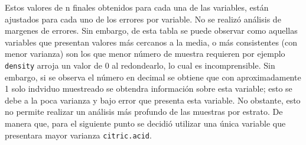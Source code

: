 \documentclass[
]{article}
\begin{document}
Estos valores de n finales obtenidos para cada una de las variables,
están ajustados para cada uno de los errores por variable. No se realizó
análisis de margenes de errores. Sin embargo, de esta tabla se puede
observar como aquellas variables que presentan valores más cercanos a la
media, o más consistentes (con menor varianza) son los que menor número
de muestra requieren por ejemplo \texttt{density} arroja un valor de 0
al redondearlo, lo cual es incomprensible. Sin embargo, si se observa el
número en decimal se obtiene que con aproximadamente 1 solo indviduo
muestreado se obtendra información sobre esta variable; esto se debe a
la poca varianza y bajo error que presenta esta variable. No obstante,
esto no permite realizar un análisis más profundo de las muestras por
estrato. De manera que, para el siguiente punto se decidió utilizar una
única variable que presentara mayor varianza \texttt{citric.acid}.
\end{document}

